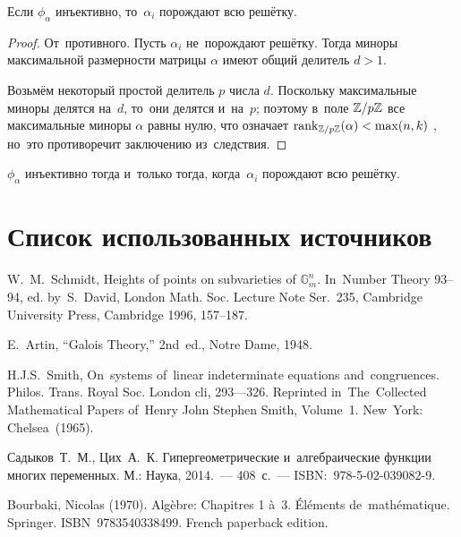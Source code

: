 \documentclass{article}
\begin{document}
\begin{lemma*}
    Если $\phi_\alpha$ инъективно, то~$\alpha_i$ порождают всю решётку.
\end{lemma*}

\begin{proof}
    От~противного. Пусть $\alpha_i$ не~порождают решётку. Тогда миноры максимальной размерности
    матрицы $\alpha$ имеют общий делитель $d > 1$.

    Возьмём некоторый простой делитель $p$ числа $d$. Поскольку максимальные миноры
    делятся на~$d$, то~они делятся и~на~$p$; поэтому в~поле $\mathbb{Z} / p \mathbb{Z}$
    все максимальные миноры $\alpha$ равны нулю, что означает $\mathrm{rank}_{\mathbb{Z} / p \mathbb{Z}}(\alpha) < \max(n, k)$ \cite{Brbk70},
    но~это противоречит заключению из~следствия.
\end{proof}

\begin{consequence*}
    $\phi_\alpha$ инъективно тогда и~только тогда, когда~$\alpha_i$ порождают всю решётку.
\end{consequence*}

\pagebreak

\titleformat{\section}{\centering\normalfont\Large\bfseries}{}{0em}{}
\section{Список использованных источников}

\begin{thebibliography}{9}

 W.~M.~Schmidt, Heights of points on subvarieties of $\mathbb{G}^n_m$.
In~Number Theory 93–94, ed. by~S.~David, London Math. Soc. Lecture Note Ser.~235,
Cambridge University Press, Cambridge 1996, 157–187.

 E.~Artin, “Galois Theory,” 2nd~ed., Notre Dame, 1948.

 H.J.S.~Smith, On~systems of~linear indeterminate equations and~congruences. Philos. Trans. Royal
Soc. London cli, 293—326. Reprinted in~The~Collected Mathematical Papers of~Henry John Stephen Smith,
Volume~1. New~York: Chelsea~(1965).

 Садыков~Т.~М., Цих~А.~К. Гипергеометрические и~алгебраические функции многих переменных.
М.: Наука, 2014.~— 408 с.~— ISBN: 978-5-02-039082-9.

 Bourbaki, Nicolas (1970). Algèbre: Chapitres 1 à~3. Éléments de~mathématique. Springer. ISBN~9783540338499. French paperback edition.

\end{thebibliography}
\end{document}
